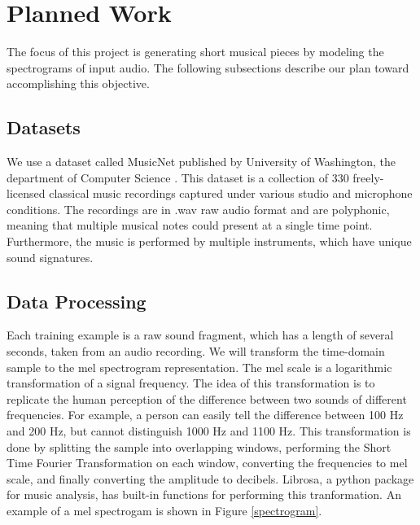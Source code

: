 \documentclass[sigconf,authorversion]{acmart}
\begin{document}
\section{Planned Work}
The focus of this project is generating short musical pieces by modeling the spectrograms of input audio. The
following subsections describe our plan toward accomplishing this objective.

\subsection{Datasets}
We use a dataset called MusicNet published by University of Washington, the department of Computer Science 
\cite{thickstun2017learning}. This dataset is a collection of 330 freely-licensed classical music recordings 
captured under various studio and microphone conditions. The recordings are in .wav raw audio format and are
polyphonic, meaning that multiple musical notes could present at a single time point. Furthermore, the music is
performed by multiple instruments, which have unique sound signatures. 

\subsection{Data Processing}
Each training example is a raw sound fragment, which has a length of several seconds, taken from an audio recording.
We will transform the time-domain sample to the mel spectrogram representation. The mel scale is a logarithmic
transformation of a signal frequency. The idea of this transformation is to replicate the human perception of the 
difference between two sounds of different frequencies. For example, a person can easily tell the difference between 
100 Hz and 200 Hz, but cannot distinguish 1000 Hz and 1100 Hz. This transformation is done by splitting the sample
into overlapping windows, performing the Short Time Fourier Transformation on each window, converting the frequencies
to mel scale, and finally converting the amplitude to decibels. Librosa, a python package for music analysis, has
built-in functions for performing this tranformation. An example of a mel spectrogam is shown in Figure \ref{spectrogram}.
\end{document}
